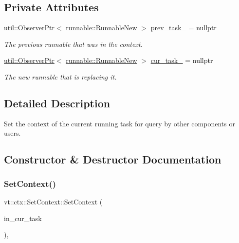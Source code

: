 \subsection*{Private Attributes}
\begin{DoxyCompactItemize}
\item 
\hyperlink{namespacevt_1_1util_a7d480434049896696b9a50c38a766202}{util\+::\+Observer\+Ptr}$<$ \hyperlink{structvt_1_1runnable_1_1_runnable_new}{runnable\+::\+Runnable\+New} $>$ \hyperlink{structvt_1_1ctx_1_1_set_context_af5a9e9f7f2f7deeadd17da554e8aa39b}{prev\+\_\+task\+\_\+} = nullptr
\begin{DoxyCompactList}\small\item\em The previous runnable that was in the context. \end{DoxyCompactList}\item 
\hyperlink{namespacevt_1_1util_a7d480434049896696b9a50c38a766202}{util\+::\+Observer\+Ptr}$<$ \hyperlink{structvt_1_1runnable_1_1_runnable_new}{runnable\+::\+Runnable\+New} $>$ \hyperlink{structvt_1_1ctx_1_1_set_context_a54caa513b9c676ccbd100f701f10ba81}{cur\+\_\+task\+\_\+} = nullptr
\begin{DoxyCompactList}\small\item\em The new runnable that is replacing it. \end{DoxyCompactList}\end{DoxyCompactItemize}


\subsection{Detailed Description}
Set the context of the current running task for query by other components or users. 

\subsection{Constructor \& Destructor Documentation}
\mbox{\label{structvt_1_1ctx_1_1_set_context_a6a7f8fd4952c150c2076801d108bacd6}} 
\subsubsection{\texorpdfstring{Set\+Context()}{SetContext()}}
{\footnotesize\ttfamily vt\+::ctx\+::\+Set\+Context\+::\+Set\+Context (\begin{DoxyParamCaption}\item[{\hyperlink{structvt_1_1runnable_1_1_runnable_new}{runnable\+::\+Runnable\+New} $\ast$}]{in\+\_\+cur\+\_\+task }\end{DoxyParamCaption})\hspace{0.3cm}{\ttfamily [inline]}, {\ttfamily [explicit]}}



